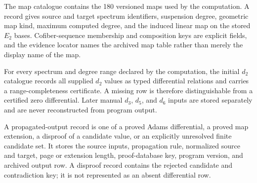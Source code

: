 \begin{definition}
  \label{def:lin-map-catalogue}
  \notready
  The map catalogue contains the 180 versioned maps used by the computation.
  A record gives source and target spectrum identifiers, suspension degree,
  geometric map kind, maximum computed degree, and the induced linear map on
  the stored $E_2$ bases.  Cofiber-sequence membership and composition keys are
  explicit fields, and the evidence locator names the archived map table rather
  than merely the display name of the map.
\end{definition}

\begin{definition}
  \label{def:lin-d2-catalogue}
  \notready
  For every spectrum and degree range declared by the computation, the initial
  $d_2$ catalogue records all supplied $d_2$ values as typed differential
  relations and carries a range-completeness certificate.  A missing row is
  therefore distinguishable from a certified zero differential.  Later manual
  $d_3$, $d_5$, and $d_6$ inputs are stored separately and are never
  reconstructed from program output.
\end{definition}

\begin{definition}
  \label{def:lin-propagated-output-record}
  \notready
  A propagated-output record is one of a proved Adams differential, a proved
  map extension, a disproof of a candidate value, or an explicitly unresolved
  finite candidate set.  It stores the source inputs, propagation rule,
  normalized source and target, page or extension length, proof-database key,
  program version, and archived output row.  A disproof record contains the
  rejected candidate and contradiction key; it is not represented as an absent
  differential row.
\end{definition}

